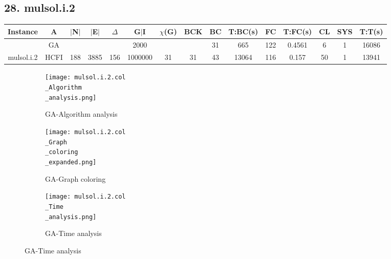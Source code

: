 \documentclass[10pt]{article}
\begin{document}
\subsection*{\hspace{0,9073976cm} 28. mulsol.i.2}
\begin{table}[H]
\centering
\begin{tabular}{|c|c|c|c|c|c|c|c|c|c|c|c|c|c|c|}
\hline
Instance& A &$|$N$|$ & $|$E$|$ & $\Delta$ & G$|$I & $\chi$(G) &BCK&BC & T:BC(s) & FC & T:FC(s) & CL & SYS & T:T(s) \\ \hline \hline

	&GA&       &                   &                     &     2000    &     \cellcolor{yellow} & {\cellcolor{yellow}}& {{\cellcolor{green}31}}
&665   &122        &0.4561                   & 6                   &1          &16086        \\ \cline{2-2} \cline{6-6} \cline{9-15}
 \multirow{-2}{*}{mulsol.i.2} &HCFI   &\multirow{-2}{*}{188}   &\multirow{-2}{*}{3885}     &\multirow{-2}{*}{156}     &1000000     &\multirow{-2}{*}{\cellcolor{yellow}31}      & \multirow{-2}{*}{\cellcolor{yellow}31}    &{\cellcolor{green}43}     &13064         &116    &0.157         &50    &1     &13941        \\ \hline 
\end{tabular}
\end{table}
\graphicspath{{./Core1/Solutions/GA/mulsol.i.2.col}}
\begin{figure}[H]
\begin{subfigure}{.33\textwidth}
  \centering
  \texttt{[image: mulsol.i.2.col\\\_Algorithm\\\_analysis.png]}
  \caption{GA-Algorithm analysis}
   \label{fig:subfig1}
\end{subfigure}%
\begin{subfigure}{.33\textwidth}
  \centering
  \texttt{[image: mulsol.i.2.col\\\_Graph\\\_coloring\\\_expanded.png]}
  \caption{GA-Graph coloring}
  \label{fig:subfig2}
\end{subfigure}
\begin{subfigure}{.33\textwidth}
  \centering
  \texttt{[image: mulsol.i.2.col\\\_Time\\\_analysis.png]}
  \caption{GA-Time analysis}
  \end{subfigure}
\end{figure}
\end{document}
